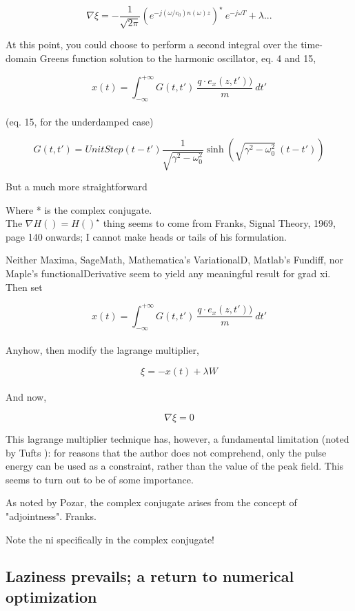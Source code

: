 \documentclass[paper.tex]{subfiles}
\begin{document}
$$ \nabla \xi = -\frac{1}{\sqrt{2\pi}} \left(e^{- j (\omega/c_0)n(\omega)z}\right)^\star \  e^{-j\omega T} + \lambda...$$

At this point, you could choose to perform a second integral over the time-domain Greens function solution to the harmonic oscillator\cite{Complex2020}, eq. 4 and 15, 

$$x(t) = \int_{-\infty}^{+\infty}{G(t,t')\ \frac{q\cdot e_x(z,t'))}{m}\ } dt'$$\\

(eq. 15, for the underdamped case)

$$G(t,t') = UnitStep(t-t') \frac{1}{\sqrt{\gamma^2-\omega_0^2}  }\sinh\left({\sqrt{\gamma^2-\omega_0^2}}\ (t-t')\right)$$

But a much more straightforward 

Where * is the complex conjugate.\\

The $\nabla H() = H()^\star$ thing seems to come from Franks, Signal Theory, 1969, page 140 onwards; I cannot make heads or tails of his formulation.

Neither Maxima, SageMath, Mathematica's VariationalD, Matlab's Fundiff, nor Maple's 
functionalDerivative seem to yield any meaningful result for grad xi.\\

Then set

$$x(t) = \int_{-\infty}^{+\infty}{G(t,t')\ \frac{q\cdot e_x(z,t'))}{m}\ } dt'$$\\

Anyhow, then modify the lagrange multiplier,

$$\xi = -x(t) + \lambda W$$\\

And now,

$$\nabla \xi = 0$$

This lagrange multiplier technique has, however, a fundamental limitation (noted by Tufts \cite{Optimum1964}): for reasons that the author does not comprehend, only the pulse energy can be used as a constraint, rather than the value of the peak field. This seems to turn out to be of some importance.




As noted by Pozar, the complex conjugate arises from the concept of "adjointness". Franks.

Note the ni specifically in the complex conjugate!


\subsection{Laziness prevails; a return to numerical optimization}
\end{document}

